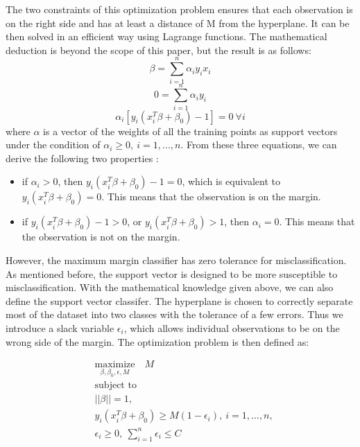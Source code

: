 The two constraints of this optimization problem ensures that each observation is on the right side
and has at least a distance of M from the hyperplane. It can be then solved in an efficient way using
Lagrange functions. The mathematical deduction is beyond the scope of this paper, 
but the result is as follows:
\begin{equation}
    \beta = \sum_{i=1}^n \alpha_i y_i x_i
\end{equation}
\begin{equation}
    0 = \sum_{i=1}^n \alpha_i y_i
\end{equation}
\begin{equation}
    \alpha_i[y_i(x_i^T\beta + \beta_0) - 1] = 0\ \forall i
\end{equation}
where $\alpha$ is a vector of the weights of all the training points as support vectors
under the condition of $\alpha_i \geq 0,\ i = 1, ..., n$. From these three equations, we can
derive the following two properties \cite{Elements4}:
\begin{itemize}
    \item if $\alpha_i > 0$, then $y_i(x_i^T\beta + \beta_0) - 1 = 0$, which is equivalent to
    $y_i(x_i^T\beta + \beta_0) = 0$. This means that the observation is on the margin.
    \item if $y_i(x_i^T\beta + \beta_0) - 1 > 0$, or $y_i(x_i^T\beta + \beta_0) > 1$, then
    $\alpha_i = 0$. This means that the observation is not on the margin.
  \end{itemize}




However, the maximum margin classifier has zero tolerance for misclassification. As mentioned before,
the support vector is designed to be more susceptible to misclassification. With the mathematical knowledge
given above, we can also define the support vector classifer. The hyperplane
is chosen to correctly separate most of the dataset into two classes with the tolerance of a few errors.
Thus we introduce a slack variable $\epsilon_i$, which allows individual observations to be on the wrong side 
of the margin.
The optimization problem is then defined as\cite{R9}:

\begin{equation}
    \begin{aligned}
      & \underset{\textstyle {\beta, \beta_0, \epsilon, M}}{\text{maximize}} \quad
        M \\
      & \text{subject to} \\
      & ||\beta|| = 1, \\
      & y_i(x_i^T \beta + \beta_0) \geq M(1-\epsilon_i),\ i = 1, ..., n, \\
      & \epsilon_i \geq 0, \ \sum_{i=1}^n \epsilon_i \leq C
    \end{aligned}
\end{equation}

